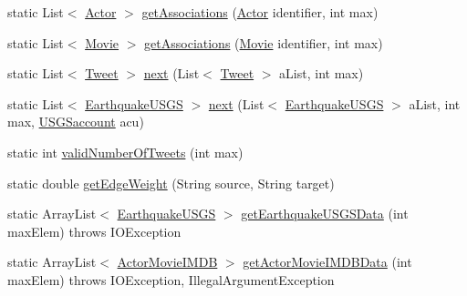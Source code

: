 \begin{DoxyCompactItemize}
\item 
static List$<$ \mbox{\hyperlink{classbridges_1_1data__src__dependent_1_1_actor}{Actor}} $>$ \mbox{\hyperlink{classbridges_1_1connect_1_1_data_formatter_a5e9f400a020b99e0bbba1fd5332a8f88}{get\+Associations}} (\mbox{\hyperlink{classbridges_1_1data__src__dependent_1_1_actor}{Actor}} identifier, int max)
\item 
static List$<$ \mbox{\hyperlink{classbridges_1_1data__src__dependent_1_1_movie}{Movie}} $>$ \mbox{\hyperlink{classbridges_1_1connect_1_1_data_formatter_ad0377b692c07836fb1016e5fb296e79c}{get\+Associations}} (\mbox{\hyperlink{classbridges_1_1data__src__dependent_1_1_movie}{Movie}} identifier, int max)
\item 
static List$<$ \mbox{\hyperlink{classbridges_1_1data__src__dependent_1_1_tweet}{Tweet}} $>$ \mbox{\hyperlink{classbridges_1_1connect_1_1_data_formatter_a3d0b2d2e0384d2a537bb61fbeb3d00a4}{next}} (List$<$ \mbox{\hyperlink{classbridges_1_1data__src__dependent_1_1_tweet}{Tweet}} $>$ a\+List, int max)
\item 
static List$<$ \mbox{\hyperlink{classbridges_1_1data__src__dependent_1_1_earthquake_u_s_g_s}{Earthquake\+U\+S\+GS}} $>$ \mbox{\hyperlink{classbridges_1_1connect_1_1_data_formatter_ad451dd96b927702127d383e85fc98661}{next}} (List$<$ \mbox{\hyperlink{classbridges_1_1data__src__dependent_1_1_earthquake_u_s_g_s}{Earthquake\+U\+S\+GS}} $>$ a\+List, int max, \mbox{\hyperlink{classbridges_1_1data__src__dependent_1_1_u_s_g_saccount}{U\+S\+G\+Saccount}} acu)
\item 
static int \mbox{\hyperlink{classbridges_1_1connect_1_1_data_formatter_ad17084ac8b0f28837ebb1d77905cefb8}{valid\+Number\+Of\+Tweets}} (int max)
\item 
static double \mbox{\hyperlink{classbridges_1_1connect_1_1_data_formatter_a2637c733e7f4efccfb56de0940506318}{get\+Edge\+Weight}} (String source, String target)
\item 
static Array\+List$<$ \mbox{\hyperlink{classbridges_1_1data__src__dependent_1_1_earthquake_u_s_g_s}{Earthquake\+U\+S\+GS}} $>$ \mbox{\hyperlink{classbridges_1_1connect_1_1_data_formatter_a31f1f3e398fbf7225c790dbbbde238dd}{get\+Earthquake\+U\+S\+G\+S\+Data}} (int max\+Elem)  throws I\+O\+Exception 
\item 
static Array\+List$<$ \mbox{\hyperlink{classbridges_1_1data__src__dependent_1_1_actor_movie_i_m_d_b}{Actor\+Movie\+I\+M\+DB}} $>$ \mbox{\hyperlink{classbridges_1_1connect_1_1_data_formatter_aa2a84fe044615b2e1b166d412babac0f}{get\+Actor\+Movie\+I\+M\+D\+B\+Data}} (int max\+Elem)  throws I\+O\+Exception, Illegal\+Argument\+Exception 

\end{DoxyCompactItemize}

